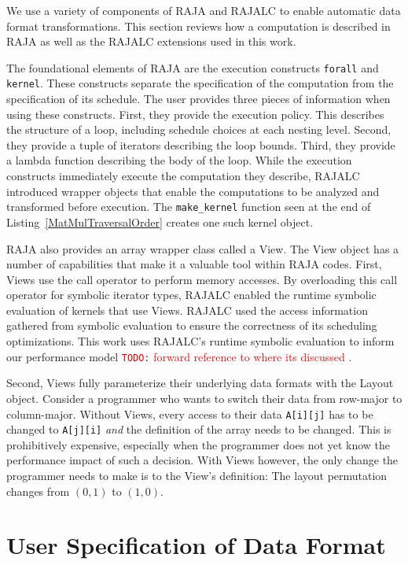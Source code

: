\documentclass[sigconf, table]{acmart}
\newcommand{\todo}[1]{{\textcolor{red}{{\tt{TODO:}}\,\,#1 }}}
\begin{document}
We use a variety of components of RAJA and RAJALC to enable automatic data format transformations. This section reviews how a computation is described in RAJA as well as the RAJALC extensions used in this work. 

The foundational elements of RAJA are the execution constructs \verb.forall. and \verb.kernel.. 
These constructs separate the specification of the computation from the specification of its schedule. 
The user provides three pieces of information when using these constructs. 
First, they provide the execution policy. 
This describes the structure of a loop, including schedule choices at each nesting level. 
Second, they provide a tuple of iterators describing the loop bounds. 
Third, they provide a lambda function describing the body of the loop.
While the execution constructs immediately execute the computation they describe, RAJALC introduced wrapper objects that enable the computations to be analyzed and transformed before execution. 
The \verb.make_kernel. function seen at the end of Listing~\ref{MatMulTraversalOrder} creates one such kernel object.

RAJA also provides an array wrapper class called a View.
The View object has a number of capabilities that make it a valuable tool within RAJA codes.
First, Views use the call operator to perform memory accesses. 
By overloading this call operator for symbolic iterator types, RAJALC enabled the runtime symbolic evaluation of kernels that use Views.
RAJALC used the access information gathered from symbolic evaluation to ensure the correctness of its scheduling optimizations.
This work uses RAJALC's runtime symbolic evaluation to inform our performance model \todo{forward reference to where its discussed}.

Second, Views fully parameterize their underlying data formats with the Layout object.
Consider a programmer who wants to switch their data from row-major to column-major. 
Without Views, every access to their data \verb.A[i][j]. has to be changed to \verb.A[j][i]. \textit{and} the definition of the array needs to be changed. 
This is prohibitively expensive, especially when the programmer does not yet know the performance impact of such a decision.
With Views however, the only change the programmer needs to make is to the View's definition: The layout permutation changes from $(0,1)$ to $(1,0)$.

\section{User Specification of Data Format}
\end{document}
